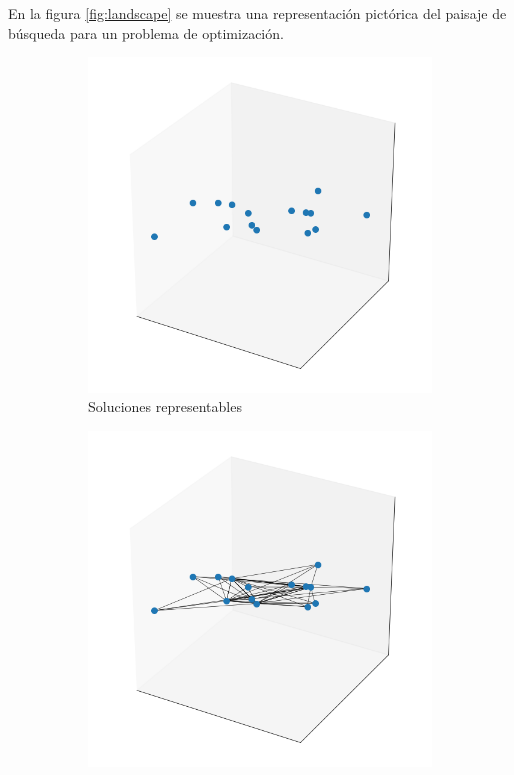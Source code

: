 En la figura \ref{fig:landscape} se muestra una representación pictórica del paisaje de búsqueda para un problema de optimización.

\begin{figure}
\begin{subfigure}{.4\textwidth}
    \includegraphics[scale=.5]{Imagenes/search1.png}
    \caption{Soluciones representables}
\end{subfigure}
\begin{subfigure}{.5\textwidth}
    \includegraphics[scale=.5]{Imagenes/search2.png}

\end{subfigure}
\end{figure}
